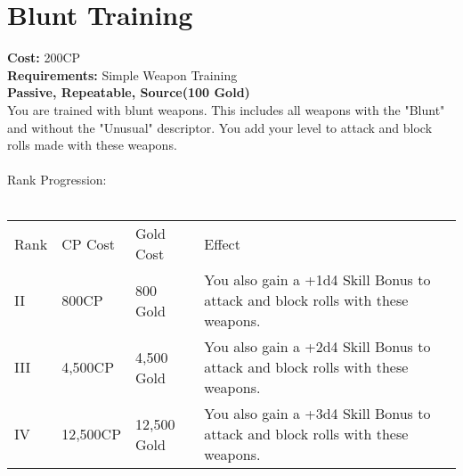 \section{Blunt Training}\label{perk:bluntTraining}
\textbf{Cost:} 200CP\\
\textbf{Requirements:} Simple Weapon Training\\
\textbf{Passive, Repeatable, Source(100 Gold)}\\
You are trained with blunt weapons.
This includes all weapons with the "Blunt" and without the "Unusual" descriptor.
You add your level to attack and block rolls made with these weapons.\\
\\
Rank Progression:\\
\\
\begin{longtable}{l | l | l | p{9cm}}
	Rank & CP Cost & Gold Cost & Effect\\
	II & 800CP & 800 Gold & You also gain a +1d4 Skill Bonus to attack and block rolls with these weapons.\\
	III & 4,500CP & 4,500 Gold & You also gain a +2d4 Skill Bonus to attack and block rolls with these weapons.\\
	IV & 12,500CP & 12,500 Gold & You also gain a +3d4 Skill Bonus to attack and block rolls with these weapons.\\
\end{longtable}